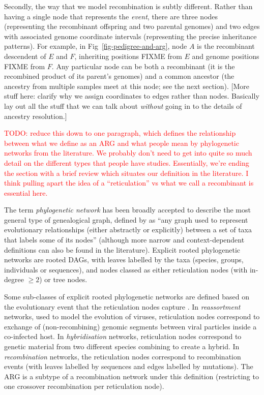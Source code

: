 \documentclass{article}
\begin{document}
Secondly, the way that we model recombination is subtly different.
Rather than having a single node that represents the \emph{event},
there are three nodes (representing the recombinant offspring and
two parental genomes) and two edges with associated genome coordinate
intervals (representing the precise inheritance patterns).
For example, in Fig~\ref{fig-pedigree-and-arg}, node $A$ is the
recombinant descendent of $E$ and $F$, inheriting positions
FIXME from $E$ and genome positions FIXME from $F$. Any particular
node can be both a recombinant (it is the recombined product of
its parent's genomes) and a common ancestor (the ancestry from
multiple samples meet at this node; see the next section).
[More stuff here: clarify why we assign coordinates to edges
rather than nodes. Basically lay out all the stuff that we can
talk about \emph{without} going in to the details of
ancestry resolution.]

\textcolor{red}{TODO: reduce this down to one paragraph, which
defines the relationship between what we define as an ARG and
what people mean by phylogenetic networks from the literature.
We probably don't need to get into quite so much detail on
the different types that people have studies. Essentially,
we're ending the section with a brief review which situates
our definition in the literature. I think pulling apart the
idea of a ``reticulation'' vs what we call a recombinant
is essential here.}

The term \emph{phylogenetic network} has been broadly accepted to describe the most general
type of genealogical graph, defined by \citet{huson2010phylogenetic} as ``any graph used to
represent evolutionary relationships (either abstractly or explicitly) between a set of taxa
that labels some of its nodes'' (although more narrow and context-dependent definitions can also
be found in the literature). Explicit rooted phylogenetic networks are rooted DAGs,
with leaves labelled by the taxa (species, groups, individuals or sequences), and nodes classed
as either reticulation nodes (with in-degree $\geq 2$) or tree nodes.

Some sub-classes of explicit rooted phylogenetic networks are defined based on the evolutionary event that the
reticulation nodes capture \citep{huson2010phylogenetic}. In \emph{reassortment} networks, used to
model the evolution of viruses, reticulation nodes correspond to exchange of
(non-recombining) genomic segments between viral particles inside a co-infected host.
In \emph{hybridisation} networks, reticulation nodes correspond to genetic material from two
different species combining to create a hybrid. In \emph{recombination} networks, the reticulation nodes
correspond to recombination events (with leaves labelled by sequences and edges labelled by mutations).
The ARG is a subtype of a recombination network under this definition (restricting to one crossover
recombination per reticulation node).
\end{document}

